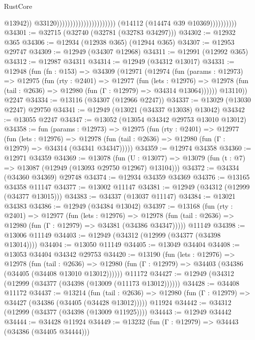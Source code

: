 \begin{lexlean}{RustCore}
\begin{coremodule}
                                                                    @13942))
                                                                @33120))))))))))))))))))))))
                    (@14112 (@14474 @39 @10369))))))))))
@34301 := @32715 (@32740 (@32781 (@32783 @34297)))
@34302 := @12932 @365
@34306 := @12934 (@12938 @365) (@12944 @365)
@34307 := @12953 @29747
@34309 := @12949 (@34307 @12968)
@34311 := @12991 (@12992 @365)
@34312 := @12987 @34311
@34314 := @12949 (@34312 @13017)
@34331 := @12948
    (fun (fn : @153) =>
    @34309
      (@12971
        (@12974
          (fun (params : @12973) =>
          @12975
            (fun (rty : @2401) =>
            @12977
              (fun (lets : @12976) =>
              @12978 (fun (tail : @2636) => @12980 (fun (Γ : @12979) => @34314 @13064))))))
        @13110))
    @2247
@34334 := @13116 (@34307 (@12966 @2247))
@34337 := @13029 (@13030 @2247) @29750
@34341 := @12949 (@13021 (@34337 @13038) @13042)
@34342 := @13055 @2247
@34347 := @13052 (@13054 @34342 @29753 @13010 @13012)
@34358 := fun (params : @12973) =>
  @12975
    (fun (rty : @2401) =>
    @12977
      (fun (lets : @12976) =>
      @12978 (fun (tail : @2636) => @12980 (fun (Γ : @12979) => @34314 (@34341 @34347)))))
@34359 := @12974 @34358
@34360 := @12971 @34359
@34369 := @13078
    (fun (U : @13077) => @13079 (fun (t : @7) => @13087 (@12949 (@13093 @29750 @12967) @13104)))
@34372 := @34334 (@34360 @34369) @29748
@34374 := @12934 @34359 @34369
@34376 := @13165 @34358 @11147
@34377 := @13002 @11147
@34381 := @12949 (@34312 (@12999 (@34377 @13015)))
@34383 := @34337 (@13037 @11147)
@34384 := @13021 @34383
@34386 := @12949 (@34384 @13042)
@34397 := @13168
    (fun (rty : @2401) =>
    @12977
      (fun (lets : @12976) =>
      @12978 (fun (tail : @2636) => @12980 (fun (Γ : @12979) => @34381 (@34386 @34347)))))
    @11149
@34398 := @13006 @11149
@34403 := @12949 (@34312 (@12999 (@34377 (@34398 @13014))))
@34404 := @13050 @11149
@34405 := @13049 @34404
@34408 := @13053 @34404 @34342 @29753
@34420 := @13190
    (fun (lets : @12976) =>
    @12978
      (fun (tail : @2636) =>
      @12980 (fun (Γ : @12979) => @34403 (@34386 (@34405 (@34408 @13010 @13012))))))
    @11172
@34427 := @12949 (@34312 (@12999 (@34377 (@34398 (@13009 (@11173 @13012))))))
@34428 := @34408 @11172
@34437 := @13214
    (fun (tail : @2636) => @12980 (fun (Γ : @12979) => @34427 (@34386 (@34405 (@34428 @13012)))))
    @11924
@34442 := @34312 (@12999 (@34377 (@34398 (@13009 @11925))))
@34443 := @12949 @34442
@34444 := @34428 @11924
@34449 := @13232 (fun (Γ : @12979) => @34443 (@34386 (@34405 @34444)))

\end{coremodule}
\end{lexlean}
